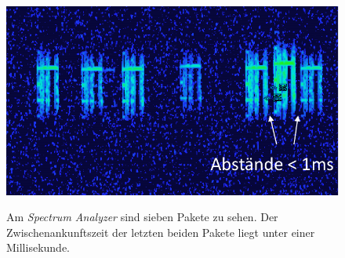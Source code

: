 \begin{figure}[bth]
        \myfloatalign
        {\includegraphics[width=0.6\linewidth]{gfx/Problem_Verarbeitung}} 
        \caption[Pakete mit kurzen Abstand]{Am \emph{Spectrum Analyzer} sind sieben Pakete zu sehen. Der Zwischenankunftszeit der letzten beiden Pakete liegt unter einer Millisekunde.}\label{fig:spec_pakete_mit_kurzem_abstand}
\end{figure}





